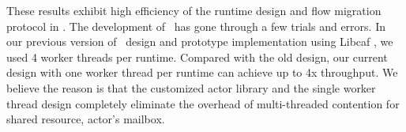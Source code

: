 These results exhibit high efficiency of the runtime design and flow migration protocol in \nfactor. %
 The development of \nfactor~has gone through a few trials and errors. In our previous version of \nfactor~design and prototype implementation using Libcaf \cite{caf}, we used 4 worker threads per runtime. Compared with the old design, our current design with one worker thread per runtime can achieve up to 4x throughput. We believe the reason is that the customized actor library and the single worker thread design completely eliminate the overhead of multi-threaded contention for shared resource, \ie actor's mailbox. %



